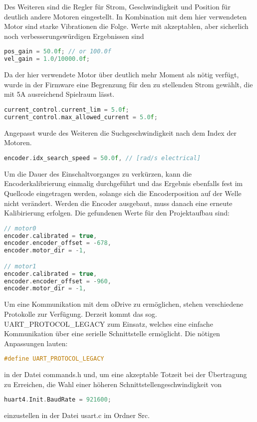 Des Weiteren sind die Regler für Strom, Geschwindigkeit und Position für deutlich andere Motoren eingestellt. In Kombination mit dem hier verwendeten Motor sind starke Vibrationen die Folge. Werte mit akzeptablen, aber sicherlich noch verbesserungswürdigen Ergebnissen sind
\begin{lstlisting}[language=C++]
pos_gain = 50.0f; // or 100.0f
vel_gain = 1.0/10000.0f;
\end{lstlisting}

Da der hier verwendete Motor über deutlich mehr Moment als nötig verfügt, wurde in der Firmware eine Begrenzung für den zu stellenden Strom gewählt, die mit 5A ausreichend Spielraum lässt.
\begin{lstlisting}[language=C++]
current_control.current_lim = 5.0f;
current_control.max_allowed_current = 5.0f;
\end{lstlisting}

Angepasst wurde des Weiteren die Suchgeschwindigkeit nach dem Index der Motoren.
\begin{lstlisting}[language=C++]
encoder.idx_search_speed = 50.0f, // [rad/s electrical]
\end{lstlisting}

Um die Dauer des Einschaltvorganges zu verkürzen, kann die Encoderkalibrierung einmalig durchgeführt und das Ergebnis ebenfalls fest im Quellcode eingetragen werden, solange sich die Encoderposition auf der Welle nicht verändert. Werden die Encoder ausgebaut, muss danach eine erneute Kalibirierung erfolgen. Die gefundenen Werte für den Projektaufbau sind:
\begin{lstlisting}[language=C++]
// motor0
encoder.calibrated = true,
encoder.encoder_offset = -678,
encoder.motor_dir = -1,

// motor1
encoder.calibrated = true,
encoder.encoder_offset = -960,
encoder.motor_dir = -1,
\end{lstlisting}

Um eine Kommunikation mit dem oDrive zu ermöglichen, stehen verschiedene Protokolle zur Verfügung. Derzeit kommt das sog. UART\_PROTOCOL\_LEGACY zum Einsatz, welches eine einfache Kommunikation über eine serielle Schnittstelle ermöglicht. Die nötigen Anpassungen lauten:
\begin{lstlisting}[language=C++]
#define UART_PROTOCOL_LEGACY
\end{lstlisting}
in der Datei commands.h und, um eine akzeptable Totzeit bei der Übertragung zu Erreichen, die Wahl einer höheren Schnittstellengeschwindigkeit von
\begin{lstlisting}[language=C++]
huart4.Init.BaudRate = 921600;
\end{lstlisting}
einzustellen in der Datei usart.c im Ordner Src.

